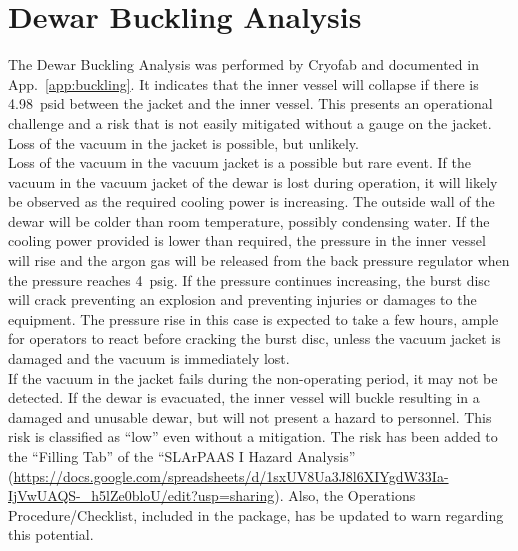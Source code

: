 \section{Dewar Buckling Analysis}
\label{sec:buckling}

The Dewar Buckling Analysis was performed by Cryofab and documented in 
App.~\ref{app:buckling}.
It indicates that the inner vessel will collapse if there is 4.98~psid between 
the jacket and the inner vessel. 
This presents an operational challenge and a risk that is not easily mitigated 
without a gauge on the jacket. 
Loss of the vacuum in the jacket is possible, but unlikely.\\

Loss of the vacuum in the vacuum jacket is a possible but rare event.
If the vacuum in the vacuum jacket of the dewar is lost during operation,
it will likely be observed as the required cooling power is increasing.
The outside wall of the dewar will be colder than room temperature,
possibly condensing water.
If the cooling power provided is lower than required,
the pressure in the inner vessel will rise and the argon gas will be released
from the back pressure regulator when the pressure reaches 4~psig.
If the pressure continues increasing, the burst disc will crack preventing
an explosion and preventing injuries or damages to the equipment.
The pressure rise in this case is expected to take a few hours,
ample for operators to react before cracking the burst disc,
unless the vacuum jacket is damaged and the vacuum is immediately lost.\\

If the vacuum in the jacket fails during the non-operating period,
it may not be detected.
If the dewar is evacuated, the inner vessel will buckle resulting in a damaged
and unusable dewar, but will not present a hazard to personnel.
This risk is classified as ``low'' even without a mitigation. 
The risk has been added to the ``Filling Tab'' of the ``SLArPAAS I Hazard Analysis''
(\url{https://docs.google.com/spreadsheets/d/1sxUV8Ua3J8l6XIYgdW33Ia-IjVwUAQS-_h5lZe0bloU/edit?usp=sharing}).
Also, the Operations Procedure/Checklist, included in the package, has be updated to warn 
regarding this potential.